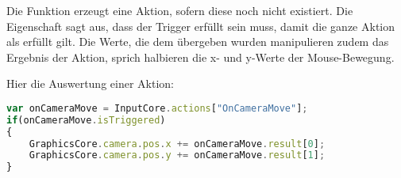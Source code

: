 Die Funktion  erzeugt eine Aktion, sofern diese noch nicht existiert. Die Eigenschaft  sagt aus, dass der Trigger erfüllt sein muss, damit die ganze Aktion als erfüllt gilt. Die Werte, die dem  übergeben wurden manipulieren zudem das Ergebnis der Aktion, sprich halbieren die x- und y-Werte der Mouse-Bewegung.

Hier die Auswertung einer Aktion:
\begin{lstlisting}[language=JavaScript, caption=Auswertung einer \textprog{InputAction}]
var onCameraMove = InputCore.actions["OnCameraMove"];
if(onCameraMove.isTriggered)
{
	GraphicsCore.camera.pos.x += onCameraMove.result[0];
	GraphicsCore.camera.pos.y += onCameraMove.result[1];
}
\end{lstlisting}